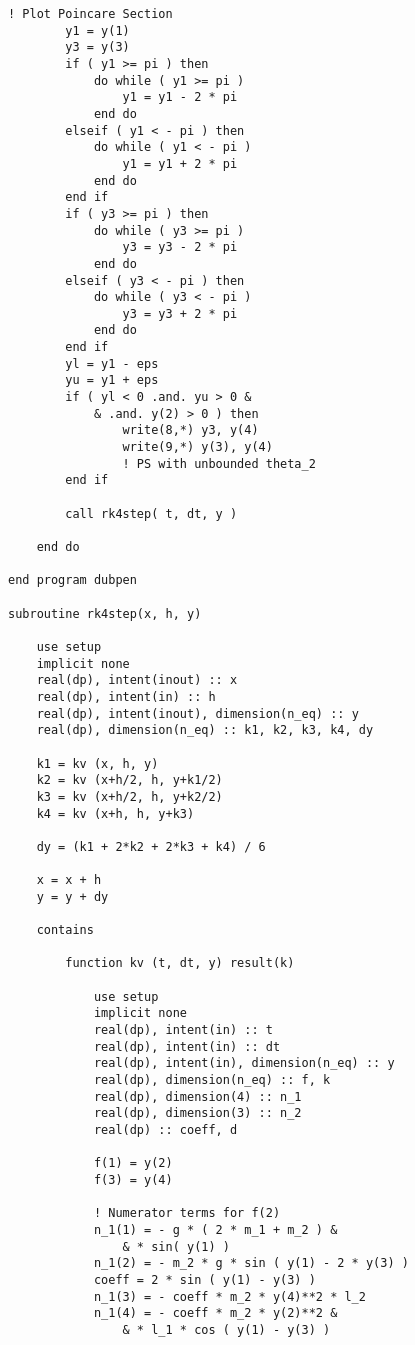 \documentclass[12pt]{article}
\begin{document}
\begin{lstlisting}[frame=single,caption={The Program {\tt dubpen.f90}.},label=dubpen]
        ! Plot Poincare Section
        y1 = y(1)
        y3 = y(3)
        if ( y1 >= pi ) then
            do while ( y1 >= pi )
                y1 = y1 - 2 * pi
            end do
        elseif ( y1 < - pi ) then
            do while ( y1 < - pi )
                y1 = y1 + 2 * pi
            end do
        end if
        if ( y3 >= pi ) then
            do while ( y3 >= pi )
                y3 = y3 - 2 * pi
            end do
        elseif ( y3 < - pi ) then
            do while ( y3 < - pi )
                y3 = y3 + 2 * pi
            end do
        end if
        yl = y1 - eps 
        yu = y1 + eps
        if ( yl < 0 .and. yu > 0 &
            & .and. y(2) > 0 ) then
                write(8,*) y3, y(4)
                write(9,*) y(3), y(4) 
                ! PS with unbounded theta_2
        end if

        call rk4step( t, dt, y )

    end do

end program dubpen

subroutine rk4step(x, h, y)

    use setup
    implicit none
    real(dp), intent(inout) :: x
    real(dp), intent(in) :: h
    real(dp), intent(inout), dimension(n_eq) :: y
    real(dp), dimension(n_eq) :: k1, k2, k3, k4, dy

    k1 = kv (x, h, y)
    k2 = kv (x+h/2, h, y+k1/2)
    k3 = kv (x+h/2, h, y+k2/2)
    k4 = kv (x+h, h, y+k3)

    dy = (k1 + 2*k2 + 2*k3 + k4) / 6

    x = x + h 
    y = y + dy

    contains

        function kv (t, dt, y) result(k)

            use setup
            implicit none
            real(dp), intent(in) :: t
            real(dp), intent(in) :: dt
            real(dp), intent(in), dimension(n_eq) :: y
            real(dp), dimension(n_eq) :: f, k
            real(dp), dimension(4) :: n_1 
            real(dp), dimension(3) :: n_2
            real(dp) :: coeff, d 

            f(1) = y(2)
            f(3) = y(4)

            ! Numerator terms for f(2)
            n_1(1) = - g * ( 2 * m_1 + m_2 ) &
                & * sin( y(1) )
            n_1(2) = - m_2 * g * sin ( y(1) - 2 * y(3) )
            coeff = 2 * sin ( y(1) - y(3) )
            n_1(3) = - coeff * m_2 * y(4)**2 * l_2
            n_1(4) = - coeff * m_2 * y(2)**2 &
                & * l_1 * cos ( y(1) - y(3) )


\end{lstlisting}
\end{document}
